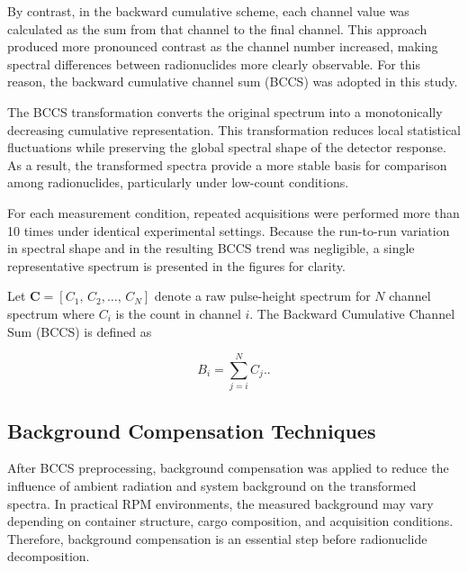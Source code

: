\documentclass[10pt]{wlscirep}
\begin{document}
By contrast, in the backward cumulative scheme, each channel value was calculated as the sum from that channel to the final channel. This approach produced more pronounced contrast as the channel number increased, making spectral differences between radionuclides more clearly observable. For this reason, the backward cumulative channel sum (BCCS) was adopted in this study.

The BCCS transformation converts the original spectrum into a monotonically decreasing cumulative representation. This transformation reduces local statistical fluctuations while preserving the global spectral shape of the detector response. As a result, the transformed spectra provide a more stable basis for comparison among radionuclides, particularly under low-count conditions.

For each measurement condition, repeated acquisitions were performed more than 10 times under identical experimental settings. Because the run-to-run variation in spectral shape and in the resulting BCCS trend was negligible, a single representative spectrum is presented in the figures for clarity.

Let $\mathbf{C} = [C_1,\,C_2,\ldots,\,C_N]$ denote a raw pulse-height spectrum for $N$ channel spectrum where $C_i$ is the count in channel $i$. The Backward Cumulative Channel Sum (BCCS) is defined as

\begin{equation}
B_i = \sum_{j=i}^N C_j. \label{eq:BCCS}.
\end{equation}



\subsection*{Background Compensation Techniques}

After BCCS preprocessing, background compensation was applied to reduce the influence of ambient radiation and system background on the transformed spectra. In practical RPM environments, the measured background may vary depending on container structure, cargo composition, and acquisition conditions. Therefore, background compensation is an essential step before radionuclide decomposition.
\end{document}
